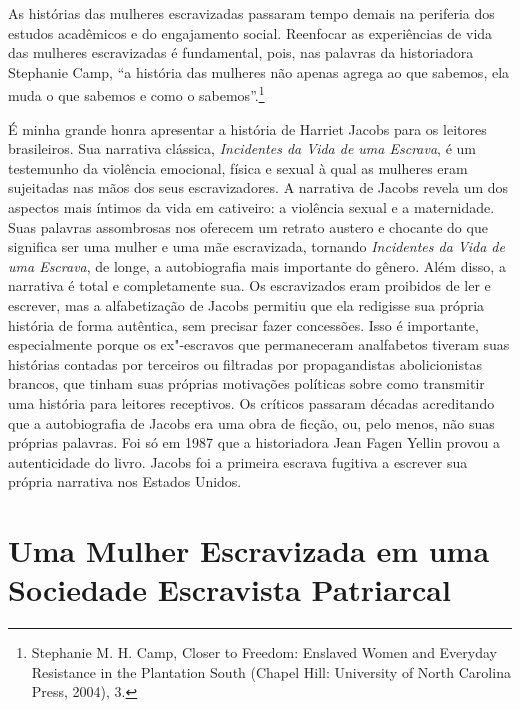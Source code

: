 As histórias das mulheres escravizadas
passaram tempo demais na periferia dos estudos acadêmicos e do
engajamento social. Reenfocar as experiências de vida das
mulheres escravizadas é fundamental, pois, nas palavras da historiadora
Stephanie Camp, ``a história das mulheres não apenas agrega ao que
sabemos, ela muda o que sabemos e como o sabemos''.\footnote{Stephanie
  M. H. Camp, Closer to Freedom: Enslaved Women and Everyday Resistance
  in the Plantation South (Chapel Hill: University of North Carolina
  Press, 2004), 3.}

É minha grande honra apresentar a história de Harriet Jacobs para os
leitores brasileiros. Sua narrativa clássica, \emph{Incidentes da Vida
de uma Escrava}, é um testemunho da violência emocional, física e sexual
à qual as mulheres eram sujeitadas nas mãos dos seus escravizadores. A
narrativa de Jacobs revela um dos aspectos mais íntimos da vida em
cativeiro: a violência sexual e a maternidade. Suas palavras assombrosas
nos oferecem um retrato austero e chocante do que significa ser uma
mulher e uma mãe escravizada, tornando \emph{Incidentes da Vida de uma Escrava},
de longe, a autobiografia mais importante do gênero. Além disso, a
narrativa é total e completamente sua. Os escravizados eram proibidos de
ler e escrever, mas a alfabetização de Jacobs permitiu que ela
redigisse sua própria história de forma autêntica, sem precisar fazer
concessões. Isso é importante, especialmente porque os ex"-escravos que
permaneceram analfabetos tiveram suas histórias contadas por terceiros
ou filtradas por propagandistas abolicionistas brancos, que tinham suas
próprias motivações políticas sobre como transmitir uma história para
leitores receptivos. Os críticos passaram décadas acreditando que a
autobiografia de Jacobs era uma obra de ficção, ou, pelo menos, não suas
próprias palavras. Foi só em 1987 que a historiadora Jean Fagen Yellin
provou a autenticidade do livro. Jacobs foi a primeira escrava fugitiva
a escrever sua própria narrativa nos Estados Unidos.

\section{Uma Mulher Escravizada em uma Sociedade Escravista Patriarcal}

